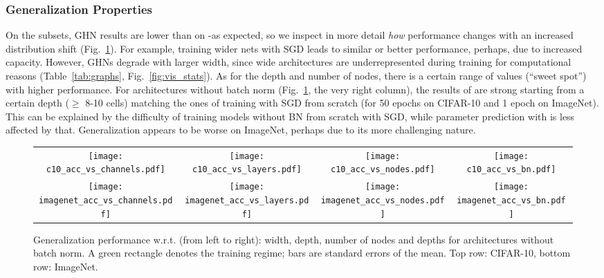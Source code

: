 \subsubsection{Generalization Properties\label{apdx:gener}}
On the \ood subsets, GHN results are lower than on \iid-\iidtest as expected, so we inspect in more detail \textit{how} performance changes with an increased distribution shift (Fig.~\ref{fig:generalize_all}).
For example, training wider nets with SGD leads to similar or better performance, perhaps, due to increased capacity. 
However, GHNs degrade with larger width, since wide architectures are underrepresented during training for computational reasons (Table~\ref{tab:graphs}, Fig.~\ref{fig:vis_stats}). As for the depth and number of nodes, there is a certain range of values (``sweet spot'') with higher performance. For architectures without batch norm (Fig.~\ref{fig:generalize_all}, the very right column), the results of \ghnours are strong starting from a certain depth ($\geq$ 8-10 cells) matching the ones of training with SGD from scratch (for 50 epochs on CIFAR-10 and 1 epoch on ImageNet). This can be explained by the difficulty of training models without BN from scratch with SGD, while parameter prediction with \ghnours is less affected by that.
Generalization appears to be worse on ImageNet, perhaps due to its more challenging nature.


\begin{figure}[tbhp]
	\centering
	\setlength{\tabcolsep}{1pt}
	\begin{tabular}{cccc}
		{\texttt{[image: c10\_acc\_vs\_channels.pdf]}} & \texttt{[image: c10\_acc\_vs\_layers.pdf]} &
		\texttt{[image: c10\_acc\_vs\_nodes.pdf]} &
		\texttt{[image: c10\_acc\_vs\_bn.pdf]} \\
		\texttt{[image: imagenet\_acc\_vs\_channels.pdf]} & \texttt{[image: imagenet\_acc\_vs\_layers.pdf]} &
		\texttt{[image: imagenet\_acc\_vs\_nodes.pdf]} &
		\texttt{[image: imagenet\_acc\_vs\_bn.pdf]} \\
	\end{tabular}
	\caption{Generalization performance w.r.t. (from left to right): width, depth, number of nodes and depths for architectures without batch norm. A green rectangle denotes the training regime; bars are standard errors of the mean. Top row: CIFAR-10, bottom row: ImageNet.}
	\label{fig:generalize_all}
\end{figure}



